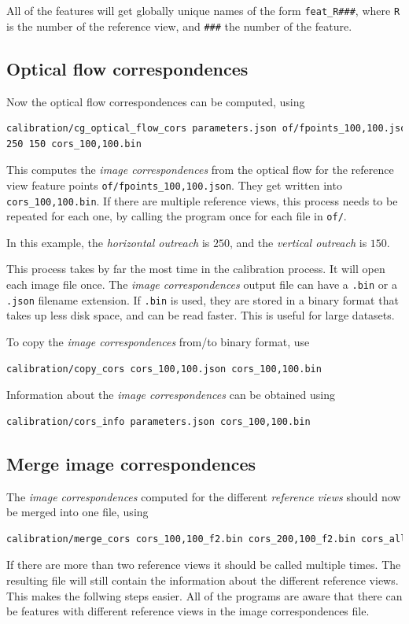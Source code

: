 \documentclass{scrreprt}
\begin{document}
All of the features will get globally unique names of the form \texttt{feat\_R###}, where \texttt{R} is the number of the reference view, and \texttt{###} the number of the feature.

\subsection{Optical flow correspondences}
Now the optical flow correspondences can be computed, using
\begin{lstlisting}[language=bash]
calibration/cg_optical_flow_cors parameters.json of/fpoints_100,100.json
250 150 cors_100,100.bin
\end{lstlisting}
This computes the \emph{image correspondences} from the optical flow for the reference view feature points \texttt{of/fpoints\_100,100.json}. They get written into \texttt{cors\_100,100.bin}. If there are multiple reference views, this process needs to be repeated for each one, by calling the program once for each file in \texttt{of/}.

In this example, the \emph{horizontal outreach} is $250$, and the \emph{vertical outreach} is $150$.

This process takes by far the most time in the calibration process. It will open each image file once. The \emph{image correspondences} output file can have a \texttt{.bin} or a \texttt{.json} filename extension. If \texttt{.bin} is used, they are stored in a binary format that takes up less disk space, and can be read faster. This is useful for large datasets.

To copy the \emph{image correspondences} from/to binary format, use
\begin{lstlisting}[language=bash]
calibration/copy_cors cors_100,100.json cors_100,100.bin
\end{lstlisting}

Information about the \emph{image correspondences} can be obtained using
\begin{lstlisting}[language=bash]
calibration/cors_info parameters.json cors_100,100.bin
\end{lstlisting}

\subsection{Merge image correspondences}
The \emph{image correspondences} computed for the different \emph{reference views} should now be merged into one file, using
\begin{lstlisting}[language=bash]
calibration/merge_cors cors_100,100_f2.bin cors_200,100_f2.bin cors_all.bin
\end{lstlisting}
If there are more than two reference views it should be called multiple times. The resulting file will still contain the information about the different reference views. This makes the follwing steps easier. All of the programs are aware that there can be features with different reference views in the image correspondences file.
\end{document}
